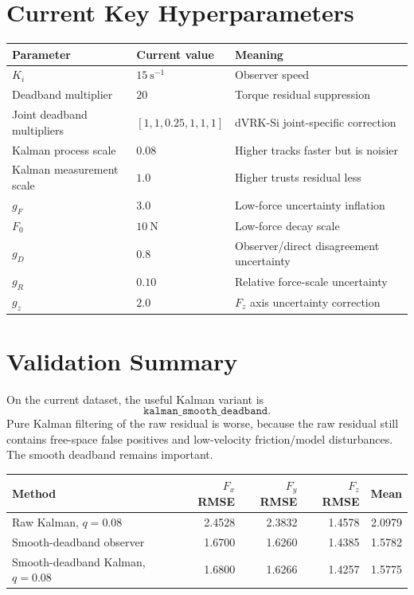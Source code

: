 \documentclass[11pt]{article}
\begin{document}
\section{Current Key Hyperparameters}

\begin{table}[H]
\centering
\begin{tabular}{lll}
\toprule
Parameter & Current value & Meaning\\
\midrule
\(K_i\) & \(15~\mathrm{s}^{-1}\) & Observer speed\\
Deadband multiplier & \(20\) & Torque residual suppression\\
Joint deadband multipliers & \([1,1,0.25,1,1,1]\) & dVRK-Si joint-specific correction\\
Kalman process scale & \(0.08\) & Higher tracks faster but is noisier\\
Kalman measurement scale & \(1.0\) & Higher trusts residual less\\
\(g_F\) & \(3.0\) & Low-force uncertainty inflation\\
\(F_0\) & \(10~\mathrm{N}\) & Low-force decay scale\\
\(g_D\) & \(0.8\) & Observer/direct disagreement uncertainty\\
\(g_R\) & \(0.10\) & Relative force-scale uncertainty\\
\(g_z\) & \(2.0\) & \(F_z\) axis uncertainty correction\\
\bottomrule
\end{tabular}
\end{table}

\section{Validation Summary}

On the current dataset, the useful Kalman variant is
\[
\texttt{kalman\_smooth\_deadband}.
\]
Pure Kalman filtering of the raw residual is worse, because the raw residual
still contains free-space false positives and low-velocity friction/model
disturbances. The smooth deadband remains important.

\begin{table}[H]
\centering
\begin{tabular}{lrrrr}
\toprule
Method & \(F_x\) RMSE & \(F_y\) RMSE & \(F_z\) RMSE & Mean\\
\midrule
Raw Kalman, \(q=0.08\) & 2.4528 & 2.3832 & 1.4578 & 2.0979\\
Smooth-deadband observer & 1.6700 & 1.6260 & 1.4385 & 1.5782\\
Smooth-deadband Kalman, \(q=0.08\) & 1.6800 & 1.6266 & 1.4257 & 1.5775\\
\bottomrule
\end{tabular}
\end{table}
\end{document}
